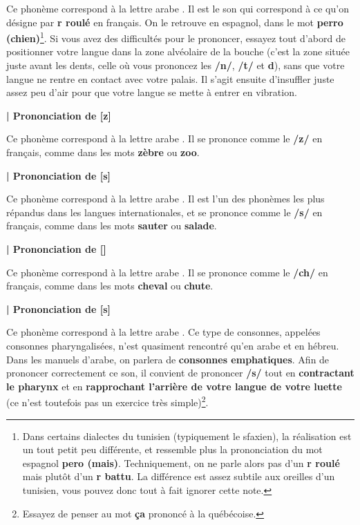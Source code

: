 Ce phonème correspond à la lettre arabe . Il est le son qui correspond à ce qu'on désigne par \textbf{r roulé} en français. On le retrouve en espagnol, dans le mot \textbf{perro (chien)}\footnote{Dans certains dialectes du tunisien (typiquement le sfaxien), la réalisation est un tout petit peu différente, et ressemble plus la prononciation du mot espagnol \textbf{pero (mais)}. Techniquement, on ne parle alors pas d'un \textbf{r roulé} mais plutôt d'un \textbf{r battu}. La différence est assez subtile aux oreilles d'un tunisien, vous pouvez donc tout à fait ignorer cette note.}. Si vous avez des difficultés pour le prononcer, essayez tout d'abord de positionner votre langue dans la zone alvéolaire de la bouche (c'est la zone située juste avant les dents, celle où vous prononcez les \textbf{/n/}, \textbf{/t/} et \textbf{d}), sans que votre langue ne rentre en contact avec votre palais. Il s'agit ensuite d'insuffler juste assez peu d'air pour que votre langue se mette à entrer en vibration.


\textbf{| Prononciation de  [z]}

Ce phonème correspond à la lettre arabe . Il se prononce comme le \textbf{/z/} en français, comme dans les mots \textbf{zèbre} ou \textbf{zoo}.


\textbf{| Prononciation de  [s]}

Ce phonème correspond à la lettre arabe . Il est l'un des phonèmes les plus répandus dans les langues internationales, et se prononce comme le \textbf{/s/} en français, comme dans les mots \textbf{sauter} ou \textbf{salade}.



\textbf{| Prononciation de  [\textesh]}

Ce phonème correspond à la lettre arabe . Il se prononce comme le \textbf{/ch/} en français, comme dans les mots \textbf{cheval} ou \textbf{chute}.


\textbf{| Prononciation de  [s\super \textrevglotstop]}

Ce phonème correspond à la lettre arabe . Ce type de consonnes, appelées consonnes pharyngalisées, n'est quasiment rencontré qu'en arabe et en hébreu. Dans les manuels d'arabe, on parlera de \textbf{consonnes emphatiques}. Afin de prononcer correctement ce son, il convient de prononcer \textbf{/s/} tout en \textbf{contractant le pharynx} et en \textbf{rapprochant l'arrière de votre langue de votre luette} (ce n'est toutefois pas un exercice très simple)\footnote{Essayez de penser au mot \textbf{ça} prononcé à la québécoise.}. 



